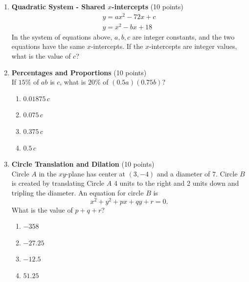 \begin{enumerate}
  \item \textbf{Quadratic System - Shared $x$-intercepts} (10 points)\\
  \[
  \begin{gathered}
  y = a x^2 - 72x + c \\
  y = x^2 - b x + 18
  \end{gathered}
  \]
  In the system of equations above, $a,b,c$ are integer constants, and the two equations have the same $x$-intercepts. If the $x$-intercepts are integer values, what is the value of $c$?
  \begin{subanswer}
  \end{subanswer}

  \newpage

  \item \textbf{Percentages and Proportions} (10 points)\\
  If $15\%$ of $ab$ is $c$, what is $20\%$ of $(0.5a)(0.75b)$?
  \begin{enumerate}[label=(\Alph*)]
    \item $0.01875\,c$
    \item $0.075\,c$
    \item $0.375\,c$
    \item $0.5\,c$
  \end{enumerate}
  \begin{subanswer}
  \end{subanswer}

  \item \textbf{Circle Translation and Dilation} (10 points)\\
  Circle $A$ in the $xy$-plane has center at $(3,-4)$ and a diameter of $7$. Circle $B$ is created by translating Circle $A$ 4 units to the right and 2 units down and tripling the diameter. An equation for circle $B$ is
  \[
  x^2+y^2+p x+q y+r=0.
  \]
  What is the value of $p+q+r$?
  \begin{enumerate}[label=(\Alph*)]
    \item $-358$
    \item $-27.25$
    \item $-12.5$
    \item $51.25$
  \end{enumerate}
  \begin{subanswer}
  \end{subanswer}




\end{enumerate}
